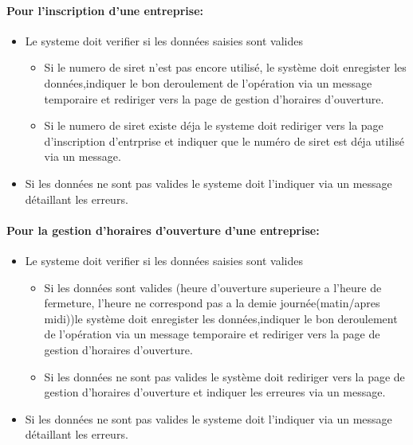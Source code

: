 \documentclass{article}
\begin{document}
\paragraph{Pour l'inscription d'une entreprise: }
\begin{itemize}
\item Le systeme doit verifier si les données saisies sont valides
	
		\begin{itemize}
		\item Si le numero de siret n'est pas encore utilisé, le système
			doit enregister les données,indiquer le bon deroulement de l'opération via un message temporaire et rediriger vers la page de gestion d'horaires d'ouverture.
		\item Si le numero de siret existe déja le systeme doit rediriger vers
			la page d'inscription d'entrprise et indiquer que le numéro de siret est déja utilisé
			via un message.
		\end{itemize}

\item Si les données ne sont pas valides le systeme doit l'indiquer
	via un message détaillant les erreurs.
\end{itemize}

\paragraph{Pour la gestion d'horaires d'ouverture d'une entreprise: }
\begin{itemize}
\item Le systeme doit verifier si les données saisies sont valides
	
		\begin{itemize}
		\item Si les données sont valides (heure d'ouverture superieure a l'heure de fermeture, l'heure ne correspond pas a la demie journée(matin/apres midi))le système
			doit enregister les données,indiquer le bon deroulement de l'opération via un message temporaire et rediriger vers la page de gestion d'horaires d'ouverture.
		\item Si les données ne sont pas valides le système doit rediriger vers
			la page de gestion d'horaires d'ouverture et indiquer les erreures
			via un message.
		\end{itemize}

\item Si les données ne sont pas valides le systeme doit l'indiquer
	via un message détaillant les erreurs.
\end{itemize}
\end{document}
